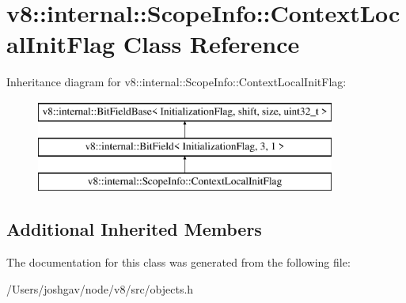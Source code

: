 \hypertarget{classv8_1_1internal_1_1_scope_info_1_1_context_local_init_flag}{}\section{v8\+:\+:internal\+:\+:Scope\+Info\+:\+:Context\+Local\+Init\+Flag Class Reference}
\label{classv8_1_1internal_1_1_scope_info_1_1_context_local_init_flag}
Inheritance diagram for v8\+:\+:internal\+:\+:Scope\+Info\+:\+:Context\+Local\+Init\+Flag\+:\begin{figure}[H]
\begin{center}
\leavevmode
\includegraphics[height=3.000000cm]{classv8_1_1internal_1_1_scope_info_1_1_context_local_init_flag}
\end{center}
\end{figure}
\subsection*{Additional Inherited Members}


The documentation for this class was generated from the following file\+:\begin{DoxyCompactItemize}
\item 
/\+Users/joshgav/node/v8/src/objects.\+h\end{DoxyCompactItemize}
